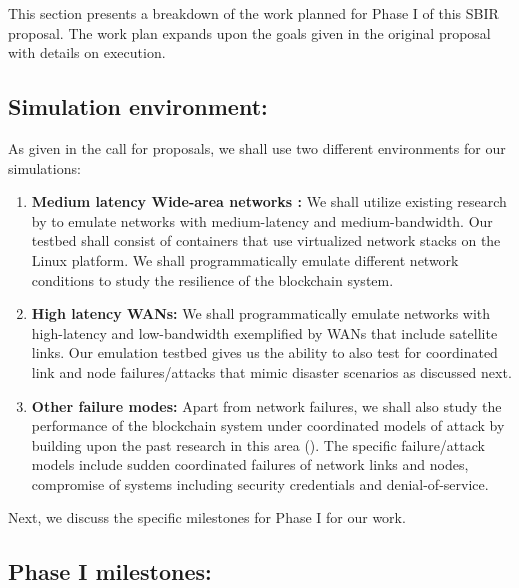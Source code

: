 \label{sec:plan}
This section presents a breakdown of the work planned for Phase I of this SBIR proposal. The work plan expands upon the
goals given in the original proposal with details on execution. 

\subsection{Simulation environment:}

As given in the call for proposals, we shall use two different environments for our simulations:

\begin{enumerate}
    \item {\bf Medium latency Wide-area networks :} We shall utilize existing research by \cite{gustaf2013, haq2017}
to emulate networks with medium-latency and medium-bandwidth. Our testbed shall consist of 
containers that use virtualized network stacks on the Linux platform. We shall programmatically
emulate different network conditions to study the resilience of the blockchain system.

\item {\bf High latency WANs:}  We shall programmatically emulate networks with high-latency and low-bandwidth
exemplified by WANs that include satellite links. Our emulation testbed gives us the ability to also test for
coordinated link and node failures/attacks that mimic disaster scenarios as discussed next.
 
\item {\bf Other failure modes:} Apart from network failures, we shall also study the performance of the blockchain
    system under coordinated models of attack by building upon the past research in this area (\cite{xiao2006, niu2017,
        kurar2014, zhou2010}). The specific failure/attack models include sudden coordinated failures of network links and nodes,
compromise of systems including security credentials and denial-of-service.

\end{enumerate}

Next, we discuss the specific milestones for Phase I for our work. 

\subsection{Phase I milestones:}

